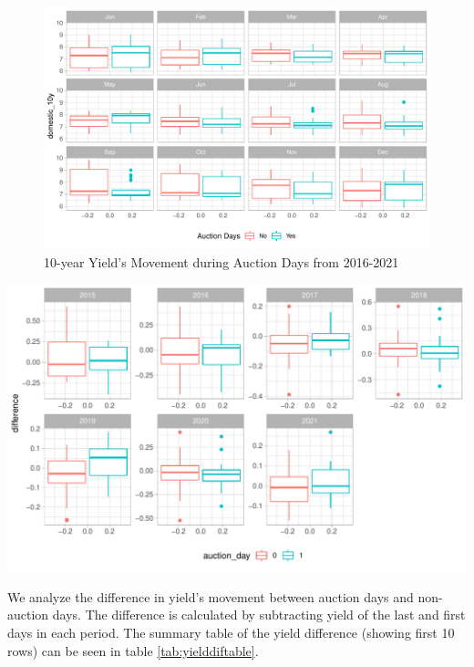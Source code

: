 \documentclass[11pt,a4paper,]{article}
\begin{document}
\begin{figure}
\centering
\includegraphics{Untitled_files/figure-latex/unnamed-chunk-18-1.pdf}
\caption{\label{fig:unnamed-chunk-18}10-year Yield's Movement during Auction Days from 2016-2021}
\end{figure}

\includegraphics{Untitled_files/figure-latex/unnamed-chunk-20-1.pdf}

We analyze the difference in yield's movement between auction days and non-auction days. The difference is calculated by subtracting yield of the last and first days in each period. The summary table of the yield difference (showing first 10 rows) can be seen in table \ref{tab:yielddiftable}.
\end{document}

